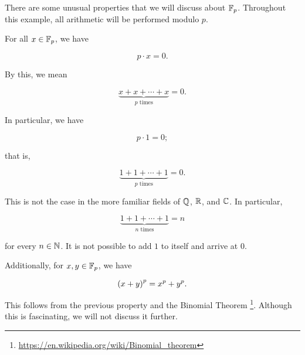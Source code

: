 \begin{example}
There are some unusual properties that we will discuss about $\mathbb{F}_{p}$.
Throughout this example, all arithmetic will be performed modulo $p$.

For all $x\in\mathbb{F}_{p}$, we have

\begin{equation}
    p\cdot x = 0.
\end{equation}

\noindent
By this, we mean

\begin{equation}
    \underbrace{x + x + \cdots + x}_{\text{$p$ times}} = 0.
\end{equation}

\noindent
In particular, we have

\begin{equation}
    p\cdot 1 = 0;
\end{equation}

\noindent
that is,

\begin{equation}
    \underbrace{1 + 1 + \cdots + 1}_{\text{$p$ times}} = 0.
\end{equation}

\noindent
This is not the case in the more familiar \glspl{field}
of $\mathbb{Q}$, $\mathbb{R}$, and $\mathbb{C}$.
In particular,

\begin{equation}
    \underbrace{1 + 1 + \cdots + 1}_{\text{$n$ times}} = n
\end{equation}

\noindent
for every $n\in\mathbb{N}$.
It is not possible to add $1$ to itself and arrive at $0$.

Additionally, for $x,y\in\mathbb{F}_{p}$, we have

\begin{equation}
    \left( x+y \right)^{p} = x^{p} + y^{p}.
\end{equation}

\noindent
This follows from the previous property and the Binomial Theorem%
\footnote{\url{https://en.wikipedia.org/wiki/Binomial_theorem}}.
Although this is fascinating, we will not discuss it further.
\end{example}

